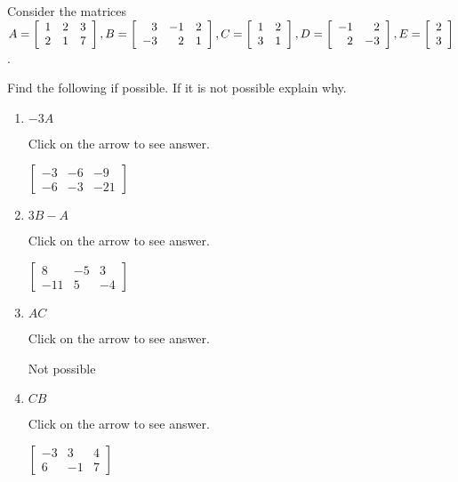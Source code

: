 \documentclass{ximera}
\begin{document}
\begin{problem}\label{prb:4.9} Consider the matrices $
A =\left[
\begin{array}{rrr}
1 & 2 & 3 \\
2 & 1 & 7
\end{array}
\right],  B=\left[
\begin{array}{rrr}
3 & -1 & 2 \\
-3 & 2 & 1
\end{array}
\right],
C =\left[
\begin{array}{rr}
1 & 2 \\
3 & 1
\end{array}
\right], \\ D=\left[
\begin{array}{rr}
-1 & 2 \\
2 & -3
\end{array}
\right],  E=\left[
\begin{array}{r}
2 \\
3
\end{array}
\right]$.

Find the following if possible. If it is not possible explain why.
\begin{enumerate}
\item $-3A$

Click on the arrow to see answer.
\begin{expandable}{}{}
$\left[
\begin{array}{rrr}
-3 & -6 & -9 \\
-6 & -3 & -21
\end{array}
\right]$
\end{expandable}

\item $3B-A$

Click on the arrow to see answer.
\begin{expandable}{}{}
$\left[
\begin{array}{rrr}
8 & -5 & 3 \\
-11 & 5 & -4
\end{array}
\right]$
\end{expandable}

\item $AC$

Click on the arrow to see answer.
\begin{expandable}{}{}
Not possible
\end{expandable}

\item $CB$

Click on the arrow to see answer.
\begin{expandable}{}{}
$\left[
\begin{array}{rrr}
-3 & 3 & 4 \\
6 & -1 & 7
\end{array}
\right]$
\end{expandable}


\end{enumerate}
\end{problem}
\end{document}
